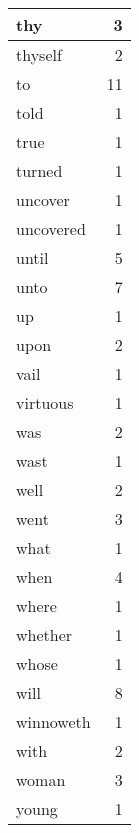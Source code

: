 \begin{center}
\begin{longtable}{l|r}
thy & 3 \\ \hline
thyself & 2 \\ \hline
to & 11 \\ \hline
told & 1 \\ \hline
true & 1 \\ \hline
turned & 1 \\ \hline
uncover & 1 \\ \hline
uncovered & 1 \\ \hline
until & 5 \\ \hline
unto & 7 \\ \hline
up & 1 \\ \hline
upon & 2 \\ \hline
vail & 1 \\ \hline
virtuous & 1 \\ \hline
was & 2 \\ \hline
wast & 1 \\ \hline
well & 2 \\ \hline
went & 3 \\ \hline
what & 1 \\ \hline
when & 4 \\ \hline
where & 1 \\ \hline
whether & 1 \\ \hline
whose & 1 \\ \hline
will & 8 \\ \hline
winnoweth & 1 \\ \hline
with & 2 \\ \hline
woman & 3 \\ \hline
young & 1 \\ \hline
\end{longtable}
\end{center}



\normalsize



